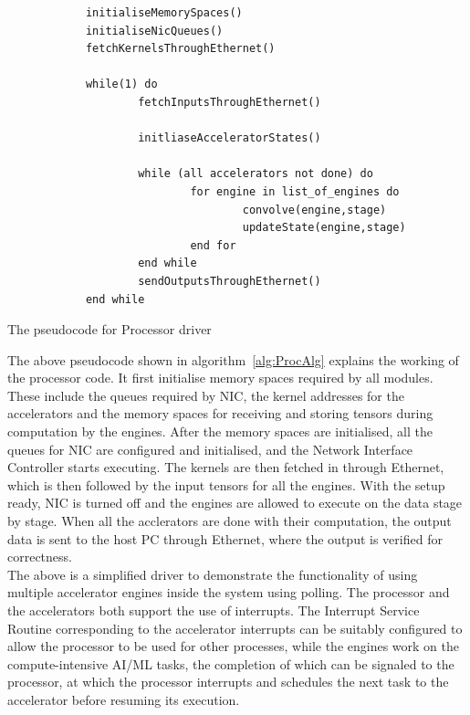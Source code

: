 \documentclass[12pt]{report}
\begin{document}
\begin{algorithm}
	\centering
	\begin{verbatim}
	        initialiseMemorySpaces()
	        initialiseNicQueues()
	        fetchKernelsThroughEthernet()
	
	        while(1) do
	                fetchInputsThroughEthernet()
			
	                initliaseAcceleratorStates()
			
	                while (all accelerators not done) do
	                        for engine in list_of_engines do
	                                convolve(engine,stage)
	                                updateState(engine,stage)
	                        end for
	                end while
	                sendOutputsThroughEthernet()
	        end while
	\end{verbatim}
	\caption{The pseudocode for Processor driver}
	\label{alg:ProcAlg}
\end{algorithm}


The above pseudocode shown in algorithm~\ref{alg:ProcAlg} explains the working of the processor code. It first initialise memory spaces required by all modules. These include the queues required by NIC, the kernel addresses for the accelerators and the memory spaces for receiving and storing tensors during computation by the engines. After the memory spaces are initialised, all the queues for NIC are configured and initialised, and the Network Interface Controller starts executing. The kernels are then fetched in through Ethernet, which is then followed by the input tensors for all the engines. With the setup ready, NIC is turned off and the engines are allowed to execute on the data stage by stage. When all the acclerators are done with their computation, the output data is sent to the host PC through Ethernet, where the output is verified for correctness.
\\

The above is a simplified driver to demonstrate the functionality of using multiple accelerator engines inside the system using polling. The processor and the accelerators both support the use of interrupts. The Interrupt Service Routine corresponding to the accelerator interrupts can be suitably configured to allow the processor to be used for other processes, while the engines work on the compute-intensive AI/ML tasks, the completion of which can be signaled to the processor, at which the processor interrupts and schedules the next task to the accelerator before resuming its execution.
\\
\end{document}
